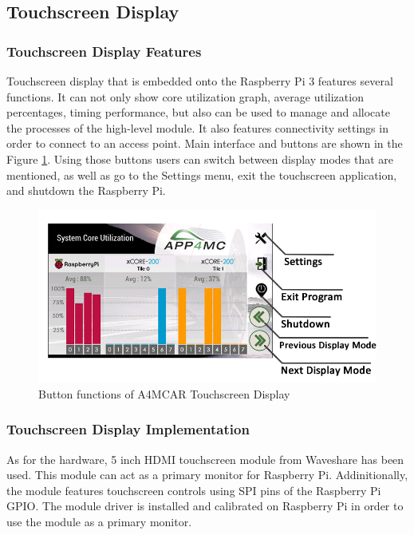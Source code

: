 \subsection{Touchscreen Display}
\subsubsection{Touchscreen Display Features}
Touchscreen display that is embedded onto the Raspberry Pi 3 features several functions. It can not only show core utilization graph, average utilization percentages, timing performance, but also can be used to manage and allocate the processes of the high-level module. It also features connectivity settings in order to connect to an access point. Main interface and buttons are shown in the Figure \ref{fig:displaybuttons}. Using those buttons users can switch between display modes that are mentioned, as well as go to the Settings menu, exit the touchscreen application, and shutdown the Raspberry Pi. 
\begin{figure}[!ht]
	\centering
	\captionsetup{justification=centering}
	\includegraphics[scale=0.5]{content/images/displaybuttons.png}
	\caption{Button functions of A4MCAR Touchscreen Display}
	\label{fig:displaybuttons}
\end{figure}

\subsubsection{Touchscreen Display Implementation}
As for the hardware, 5 inch HDMI touchscreen module from Waveshare has been used. This module can act as a primary monitor for Raspberry Pi. Addinitionally, the module features touchscreen controls using SPI pins of the Raspberry Pi GPIO. The module driver is installed and calibrated on Raspberry Pi in order to use the module as a primary monitor. 

